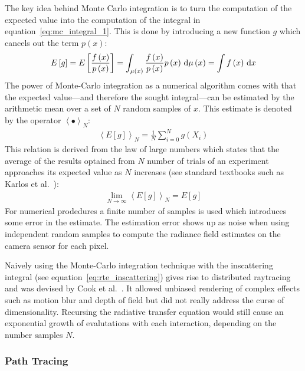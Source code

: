 The key idea behind Monte Carlo integration is to turn the computation of the expected value into the computation of the integral in equation~\ref{eq:mc_integral_1}. This is done by introducing a new function $g$ which cancels out the term $p\left(x\right)$:
\begin{align}
E\left[g\right]
=E\left[\frac{f\left(x\right)}{p\left(x\right)}\right]
= \int_{\mu\left(x\right)} \frac{f\left(x\right)}{p\left(x\right)}p\left(x\right)\,\mathrm{d}\mu\left(x\right)
=\int f\left(x\right)\,\mathrm{d} x
\end{align}
The power of Monte-Carlo integration as a numerical algorithm comes with that the expected value---and therefore the sought integral---can be estimated by the arithmetic mean over a set of $N$ random samples of $x$. This estimate is denoted by the operator $\left<\bullet\right>_N$:
\begin{align}
\left<E[g]\right>_N = 
\frac{1}{N}\sum_{i=0}^{N}
g\left(X_i\right)
\end{align}
This relation is derived from the law of large numbers which states that the average of the results optained from $N$ number of trials of an experiment approaches its expected value as $N$ increases (see standard textbooks such as Karlos et al.~\cite{Kalos86}):
\begin{align}
\lim_{N\rightarrow\infty} \left<E[g]\right>_N = E[g]
\end{align}
For numerical prodedures a finite number of samples is used which introduces some error in the estimate. The estimation error shows up as noise when using independent random samples to compute the radiance field estimates on the camera sensor for each pixel.

Naively using the Monte-Carlo integration technique with the inscattering integral (see equation~\ref{eq:rte_inscattering}) gives rise to distributed raytracing and was devised by Cook et al.~\cite{Cook84}. It allowed unbiased rendering of complex effects such as motion blur and depth of field but did not really address the curse of dimensionality. Recursing the radiative transfer equation would still cause an exponential growth of evalutations with each interaction, depending on the number samples $N$.


\subsubsection*{Path Tracing}


